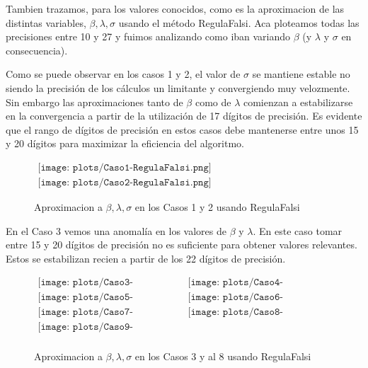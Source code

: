 Tambien trazamos, para los valores conocidos, como es la aproximacion de las distintas variables, $\beta, \lambda, \sigma$ usando el m\'etodo RegulaFalsi.
Aca ploteamos todas las precisiones entre 10 y 27 y fuimos analizando como iban variando $\beta$ (y $\lambda$ y $\sigma$ en consecuencia).

Como se puede observar en los casos 1 y 2, el valor de $\sigma$ se mantiene estable no siendo la 
precisi\'on de los c\'alculos un limitante y convergiendo muy velozmente. 
Sin embargo las aproximaciones tanto de $\beta$ como de $\lambda$ comienzan a estabilizarse en la convergencia 
a partir de la utilizaci\'on de 17 d\'igitos de precisi\'on. Es evidente que el rango de d\'igitos de precisi\'on en 
estos casos debe mantenerse entre unos 15 y 20 d\'igitos para maximizar la eficiencia del algoritmo.  

\begin{figure}
$\begin{array}{c}
\texttt{[image: plots/Caso1-RegulaFalsi.png]} \\
\texttt{[image: plots/Caso2-RegulaFalsi.png]}
\end{array}$

\caption{Aproximacion a $\beta, \lambda, \sigma$ en los Casos 1 y 2 usando RegulaFalsi}
\end{figure}

En el Caso 3 vemos una anomal\'ia en los valores de $\beta$ y $\lambda$. En este caso tomar entre 15 y 20 d\'igitos de precisi\'on
no es suficiente para obtener valores relevantes. Estos se estabilizan recien a partir de los 22 d\'igitos de precisi\'on.




\begin{figure}
$\begin{array}{cc}
\texttt{[image: plots/Caso3-RegulaFalsi.png]} &
\texttt{[image: plots/Caso4-RegulaFalsi.png]} \\
\texttt{[image: plots/Caso5-RegulaFalsi.png]} &
\texttt{[image: plots/Caso6-RegulaFalsi.png]} \\
\texttt{[image: plots/Caso7-RegulaFalsi.png]} &
\texttt{[image: plots/Caso8-RegulaFalsi.png]} \\
\texttt{[image: plots/Caso9-RegulaFalsi.png]} & \\

\end{array}$

\caption{Aproximacion a $\beta, \lambda, \sigma$ en los Casos 3 y al 8 usando RegulaFalsi}
\label{fig:AproxCasosRegulaFalsi}



\end{figure}

